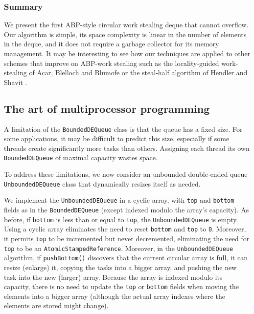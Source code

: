 \subsubsection{Summary}

We present the first ABP-style circular work stealing deque that
cannot overflow. Our algorithm is simple, its space complexity is
linear in the number of elements in the deque, and it does not require
a garbage collector for its memory management. It may be interesting
to see how our techniques are applied to other schemes that improve on
ABP-work stealing such as the locality-guided work-stealing of Acar,
Blelloch and Blumofe \cite{Acar2002} or the steal-half algorithm of
Hendler and Shavit \cite{Hendler2002}.


\subsection{The art of multiprocessor programming \cite{Herlihy2008}}

A limitation of the \lstinline!BoundedDEQueue! class is that the queue
has a fixed size. For some applications, it may be difficult to
predict this size, especially if some threads create significantly
more tasks than others. Assigning each thread its own
\lstinline!BoundedDEQueue! of maximal capacity wastes space.

To address these limitations, we now consider an unbounded
double-ended queue \lstinline!UnboundedDEQueue! class that dynamically
resizes itself as needed.

We implement the \lstinline!UnboundedDEQueue! in a cyclic array, with
\lstinline!top! and \lstinline!bottom! fields as in the
\lstinline!BoundedDEQueue! (except indexed modulo the array's
capacity). As before, if \lstinline!bottom! is less than or equal to
\lstinline!top!, the \lstinline!UnboundedDEQueue! is empty. Using a
cyclic array eliminates the need to reset \lstinline!bottom! and
\lstinline!top! to \lstinline!0!. Moreover, it permits \lstinline!top!
to be incremented but never decremented, eliminating the need for
\lstinline!top! to be an \lstinline!AtomicStampedReference!. Moreover,
in the \lstinline!UnboundedDEQueue! algorithm, if
\lstinline!pushBottom()! discovers that the current circular array is
full, it can resize (enlarge) it, copying the tasks into a bigger
array, and pushing the new task into the new (larger) array. Because
the array is indexed modulo its capacity, there is no need to update
the \lstinline!top! or \lstinline!bottom! fields when moving the
elements into a bigger array (although the actual array indexes where
the elements are stored might change).

